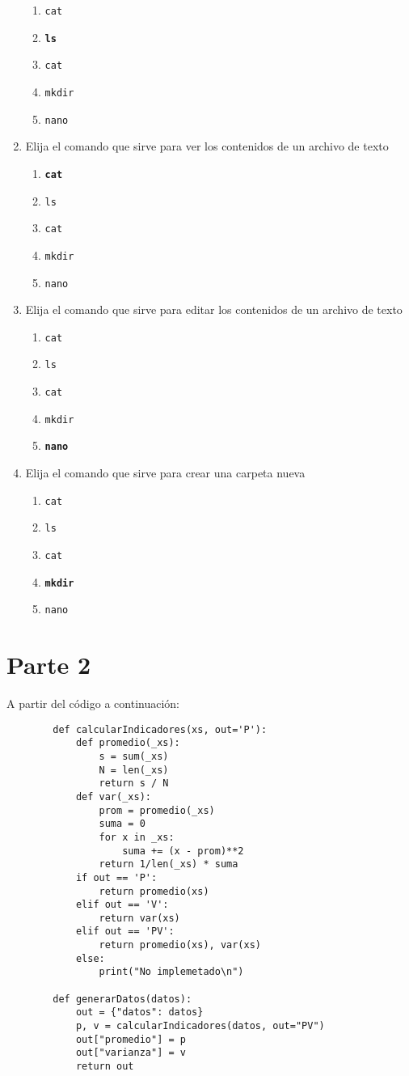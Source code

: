 \documentclass{article}
\newcommand{\code}[1]{\texttt{#1}}
\newcommand{\alternatives}[5]{
    \begin{enumerate}
        \item #1
        \item #2
        \item #3
        \item #4
        \item #5
    \end{enumerate}
}
\begin{document}
\begin{enumerate}
        \alternatives{\code{cat}}{\code{\bf ls}}{\code{cat}}{\code{mkdir}}{\code{nano}}

        \item Elija el comando que sirve para ver los contenidos de un archivo de texto

        \alternatives{\code{\bf cat}}{\code{ls}}{\code{cat}}{\code{mkdir}}{\code{nano}}

        \item Elija el comando que sirve para editar los contenidos de un archivo de texto

        \alternatives{\code{cat}}{\code{ls}}{\code{cat}}{\code{mkdir}}{\code{\bf nano}}

        \item Elija el comando que sirve para crear una carpeta nueva

        \alternatives{\code{cat}}{\code{ls}}{\code{cat}}{\code{\bf mkdir}}{\code{nano}}
    \end{enumerate}

\newpage
\section*{Parte 2}
A partir del código a continuación:
    \begin{verbatim}
        def calcularIndicadores(xs, out='P'):
            def promedio(_xs):
                s = sum(_xs)
                N = len(_xs)
                return s / N
            def var(_xs):
                prom = promedio(_xs)
                suma = 0
                for x in _xs: 
                    suma += (x - prom)**2
                return 1/len(_xs) * suma
            if out == 'P':
                return promedio(xs)
            elif out == 'V':
                return var(xs)
            elif out == 'PV':
                return promedio(xs), var(xs)
            else: 
                print("No implemetado\n")
            
        def generarDatos(datos):
            out = {"datos": datos}
            p, v = calcularIndicadores(datos, out="PV")
            out["promedio"] = p
            out["varianza"] = v
            return out
    \end{verbatim}
\end{document}
